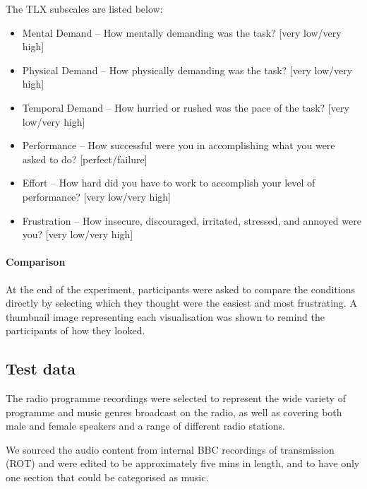 The TLX subscales are listed below:

{\singlespacing
\begin{itemize}
  \item Mental Demand -- How mentally demanding was the task? [very low/very high]
  \item Physical Demand -- How physically demanding was the task? [very low/very high]
  \item Temporal Demand -- How hurried or rushed was the pace of the task?  [very low/very high]
  \item Performance -- How successful were you in accomplishing what you were asked to do? [perfect/failure]
  \item Effort -- How hard did you have to work to accomplish your level of performance? [very low/very high]
  \item Frustration -- How insecure, discouraged, irritated, stressed, and annoyed were you? [very low/very high]
\end{itemize}
}

\paragraph{Comparison}
At the end of the experiment, participants were asked to compare the conditions directly by selecting which they
thought were the easiest and most frustrating. A thumbnail image representing each visualisation was shown to remind
the participants of how they looked.


\subsection{Test data}
The radio programme recordings were selected to represent the wide variety of programme and music genres broadcast on
the radio, as well as covering both male and female speakers and a range of different radio stations.

We sourced the audio content from internal BBC recordings of transmission (ROT) and were edited to be approximately
five mins in length, and to have only one section that could be categorised as music.

